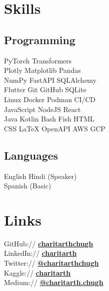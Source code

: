 \documentclass[]{resume-template}
\begin{document}
\begin{minipage}[t]{0.33\textwidth}
        \section{Skills}\label{sec:skills}

        \subsection{Programming}\label{subsec:programming}
        PyTorch \textbullet{} Transformers \textbullet{} \\
        Plotly \textbullet{} Matplotlib \textbullet{} Pandas \textbullet{}\\
        NumPy \textbullet{} FastAPI \textbullet SQLAlchemy \\ \textbullet{}%
        Flutter \textbullet{} Git \textbullet{} GitHub \textbullet{} SQLite \textbullet{}\\
        Linux \textbullet Docker \textbullet Podman \textbullet {} CI/CD \\
        JavaScript \textbullet{} NodeJS \textbullet{} React \\
        Java \textbullet{} Kotlin \textbullet{} Bash \textbullet{} Fish \textbullet{} HTML \textbullet{}\\
        CSS \textbullet{} \LaTeX \textbullet{} OpenAPI \textbullet{} AWS \textbullet{} GCP
        \vspace{\topsep}

        \subsection{Languages}
        English \textbullet{} Hindi (Speaker)\\
        Spanish (Basic)


        \section{Links}\label{sec:links}
        GitHub:// \href{https://github.com/charitarthchugh}{\textbf {charitarthchugh}} \\
        LinkedIn:// \href{https:///www.linkedin.com/in/charitarth}{\textbf {charitarth}} \\
        Twitter:// \href{https://twitter.com/charitarthchugh}{\textbf{@charitarthchugh}}\\
        Kaggle:// \href{https://kaggle.com/charitarth}{\textbf{charitarth}}\\
        Medium:// \href{https://medium.com/@charitarth.chugh}{\textbf{@charitarth.chugh}}\\

    \end{minipage}
\end{document}
